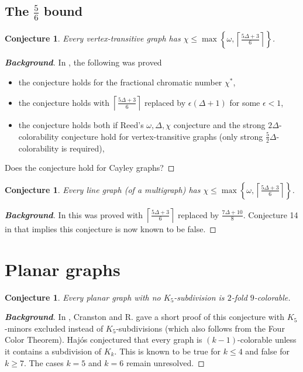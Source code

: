 \documentclass[12pt]{article}
\theoremstyle{plain}
\newtheorem{conjecture}[thm]{Conjecture}
\theoremstyle{definition}
\theoremstyle{remark}
\newcommand{\set}[1]{\left\{ #1 \right\}}
\newcommand{\ceil}[1]{\left\lceil#1\right\rceil}
\begin{document}
\subsection{The $\frac56$ bound}
\begin{conjecture}
Every vertex-transitive graph has $\chi \le \max \set{\omega, \ceil{\frac{5\Delta + 3}{6}}}$.
\end{conjecture}
\begin{proof}[\textbf{Background}]
In \cite{vertextransitive}, the following was proved
\begin{itemize}
\item the conjecture holds for the fractional chromatic number $\chi^*$,
\item the conjecture holds with $\ceil{\frac{5\Delta + 3}{6}}$ replaced by $\epsilon(\Delta + 1)$ for some $\epsilon < 1$,
\item the conjecture holds both if Reed's $\omega, \Delta, \chi$ conjecture and the strong $2\Delta$-colorability conjecture hold for vertex-transitive graphs (only strong $\frac52\Delta$-colorability is required),
\end{itemize}
Does the conjecture hold for Cayley graphs?
\end{proof}

\begin{conjecture}
Every line graph (of a multigraph) has $\chi \le \max \set{\omega, \ceil{\frac{5\Delta + 3}{6}}}$.
\end{conjecture}
\begin{proof}[\textbf{Background}]
In \cite{rabern2011strengthening} this was proved with $\ceil{\frac{5\Delta + 3}{6}}$ replaced by $\frac{7\Delta + 10}{8}$.  
Conjecture 14 in \cite{rabern2011strengthening} that implies this conjecture is now known to be false.
\end{proof}

\section{Planar graphs}
\begin{conjecture}
Every planar graph with no $K_5$-subdivision is $2$-fold $9$-colorable.
\end{conjecture}
\begin{proof}[\textbf{Background}]
In \cite{planar92}, Cranston and R. gave a short proof of this conjecture with $K_5$-minors excluded instead of $K_5$-subdivisions (which also follows from the Four Color Theorem).  Haj{\'o}s conjectured that every graph is $(k-1)$-colorable unless it contains a subdivision of
$K_k$. This is known to be true for $k \le 4$ and false for $k \ge 7$. The cases $k = 5$ and $k = 6$ remain unresolved.
\end{proof}
\end{document}
